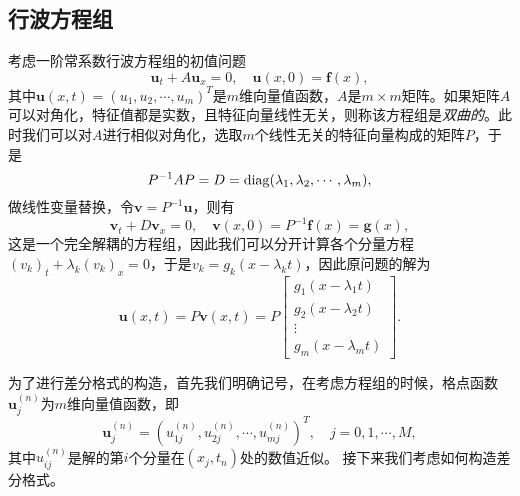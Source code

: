 \documentclass[a4paper,10pt]{ctexart}
\begin{document}
\subsection{行波方程组}
考虑一阶常系数行波方程组的初值问题
\begin{equation}
    \bm{u}_t + A\bm{u}_x = 0,\quad \bm{u}(x,0) = \bm{f}(x),
\end{equation}
其中$ \bm{u}(x,t) = (u_1, u_2,\cdots ,u_m)^T $是$ m $维向量值函数，$ A $是$ m\times m $矩阵。如果矩阵$ A $可以对角化，特征值都是实数，且特征向量线性无关，则称该方程组是\emph{双曲的}。此时我们可以对$ A $进行相似对角化，选取$ m $个线性无关的特征向量构成的矩阵$ P $，于是
\[
    P^{-1}AP = D = {\rm diag}(\lambda_1,\lambda_2,\cdots ,\lambda_m),
\]
做线性变量替换，令$ \bm{v} = P^{-1}\bm{u} $，则有
\[
    \bm{v}_t + D\bm{v}_x = 0, \quad \bm{v}(x,0) = P^{-1}\bm{f}(x) = \bm{g}(x),
\]
这是一个完全解耦的方程组，因此我们可以分开计算各个分量方程$ (v_k)_t + \lambda_k (v_k)_x = 0 $，于是$ v_k = g_k(x-\lambda_k t) $，因此原问题的解为
\[
    \bm{u}(x,t) = P\bm{v}(x,t) = P
    \begin{bmatrix} 
        g_1(x-\lambda_1 t)\\
        g_2(x-\lambda_2 t)\\
        \vdots\\
        g_m(x-\lambda_m t) 
    \end{bmatrix} .
\]

为了进行差分格式的构造，首先我们明确记号，在考虑方程组的时候，格点函数$ \bm{u}^{(n)}_j $为$ m $维向量值函数，即
\[
  \bm{u}^{(n)}_j = (u_{1j}^{(n)}, u_{2j}^{(n)},\cdots ,u_{mj}^{(n)})^T,\quad j = 0,1,\cdots ,M,
\]
其中$ u_{ij}^{(n)} $是解的第$ i $个分量在$ (x_j,t_n) $处的数值近似。
接下来我们考虑如何构造差分格式。
\end{document}
